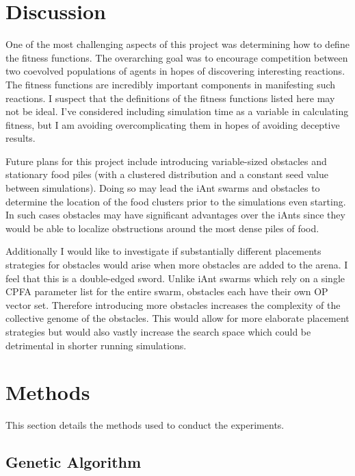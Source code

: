 \documentclass{acm_proc_article-sp}
\begin{document}
\section{Discussion}

One of the most challenging aspects of this project was determining how to define the fitness functions. The overarching goal was to encourage competition between two coevolved populations of agents in hopes of discovering interesting reactions. The fitness functions are incredibly important components in manifesting such reactions. I suspect that the definitions of the fitness functions listed here may not be ideal. I've considered including simulation time as a variable in calculating fitness, but I am avoiding overcomplicating them in hopes of avoiding deceptive results.

Future plans for this project include introducing variable-sized obstacles and stationary food piles (with a clustered distribution and a constant seed value between simulations). Doing so may lead the iAnt swarms and obstacles to determine the location of the food clusters prior to the simulations even starting. In such cases obstacles may have significant advantages over the iAnts since they would be able to localize obstructions around the most dense piles of food. 

Additionally I would like to investigate if substantially different placements strategies for obstacles would arise when more obstacles are added to the arena. I feel that this is a double-edged sword. Unlike iAnt swarms which rely on a single CPFA parameter list for the entire swarm, obstacles each have their own OP vector set. Therefore introducing more obstacles increases the complexity of the collective genome of the obstacles. This would allow for more elaborate placement strategies but would also vastly increase the search space which could be detrimental in shorter running simulations.

\section{Methods}
This section details the methods used to conduct the experiments.

\subsection{Genetic Algorithm}
\end{document}
